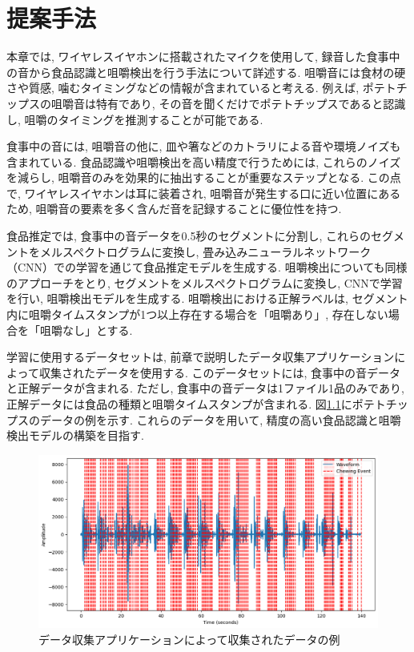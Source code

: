 
\chapter{提案手法}

本章では, ワイヤレスイヤホンに搭載されたマイクを使用して, 録音した食事中の音から食品認識と咀嚼検出を行う手法について詳述する. 咀嚼音には食材の硬さや質感, 噛むタイミングなどの情報が含まれていると考える. 例えば, ポテトチップスの咀嚼音は特有であり, その音を聞くだけでポテトチップスであると認識し, 咀嚼のタイミングを推測することが可能である.

食事中の音には, 咀嚼音の他に, 皿や箸などのカトラリによる音や環境ノイズも含まれている. 食品認識や咀嚼検出を高い精度で行うためには, これらのノイズを減らし, 咀嚼音のみを効果的に抽出することが重要なステップとなる. この点で, ワイヤレスイヤホンは耳に装着され, 咀嚼音が発生する口に近い位置にあるため, 咀嚼音の要素を多く含んだ音を記録することに優位性を持つ.

食品推定では, 食事中の音データを0.5秒のセグメントに分割し, これらのセグメントをメルスペクトログラムに変換し, 畳み込みニューラルネットワーク（CNN）での学習を通じて食品推定モデルを生成する. 咀嚼検出についても同様のアプローチをとり, セグメントをメルスペクトログラムに変換し, CNNで学習を行い, 咀嚼検出モデルを生成する. 咀嚼検出における正解ラベルは, セグメント内に咀嚼タイムスタンプが1つ以上存在する場合を「咀嚼あり」, 存在しない場合を「咀嚼なし」とする.

学習に使用するデータセットは, 前章で説明したデータ収集アプリケーションによって収集されたデータを使用する. このデータセットには, 食事中の音データと正解データが含まれる. ただし, 食事中の音データは1ファイル1品のみであり, 正解データには食品の種類と咀嚼タイムスタンプが含まれる. 図\ref{fig:wave-sample}にポテトチップスのデータの例を示す. これらのデータを用いて, 精度の高い食品認識と咀嚼検出モデルの構築を目指す.

\begin{figure}[t]
    \begin{center}
        \includegraphics[clip,  width=0.95\hsize]{img/wave-sample.png}
        \caption{データ収集アプリケーションによって収集されたデータの例}
        \label{fig:wave-sample}
    \end{center}
\end{figure}


